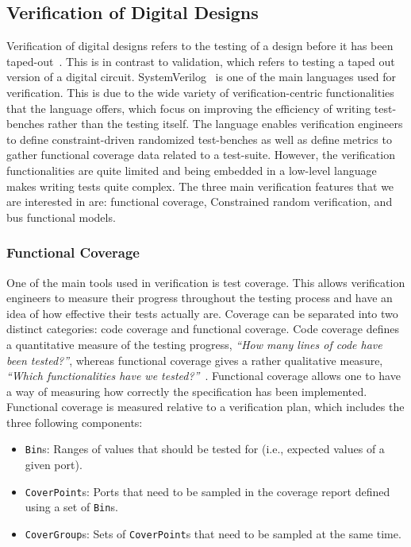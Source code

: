 \documentclass[conference]{IEEEtran}
\begin{document}
\subsection{Verification of Digital Designs}
Verification of digital designs refers to the testing of a design before it has been taped-out~\cite{spear2008systemverilog}. This is in contrast to validation, which refers to testing a taped out version of a digital circuit. 
SystemVerilog~\cite{SystemVerilog} is one of the main languages used for verification.
This is due to the wide variety of verification-centric functionalities that the language offers, which focus on improving the efficiency of writing test-benches rather than the testing itself.
The language enables verification engineers to define constraint-driven randomized test-benches as well as define metrics to gather functional coverage data related to a test-suite. 
However, the verification functionalities are quite limited and being embedded in a low-level language makes writing tests quite complex. 
The three main verification features that we are interested in are: functional coverage, Constrained random verification, and bus functional models.

\subsubsection{Functional Coverage}
One of the main tools used in verification is test coverage. 
This allows verification engineers to measure their progress throughout the testing process and have an idea of how effective their tests actually are. 
Coverage can be separated into two distinct categories: code coverage and functional coverage. 
Code coverage defines a quantitative measure of the testing progress, \textit{``How many lines of code have been tested?''}, whereas functional coverage gives a rather qualitative measure, \textit{``Which functionalities have we tested?''}~\cite{spear2008systemverilog}.
Functional coverage allows one to have a way of measuring how correctly the specification has been implemented. Functional coverage is measured relative to a verification plan, which includes the three following components:

\begin{itemize}
  \item \texttt{Bin}s: Ranges of values that should be tested for (i.e., expected values of a given port).
  \item \texttt{CoverPoint}s: Ports that need to be sampled in the coverage report defined using a set of \texttt{Bin}s.
  \item \texttt{CoverGroup}s: Sets of \texttt{CoverPoint}s that need to be sampled at the same time.
\end{itemize}
\end{document}
